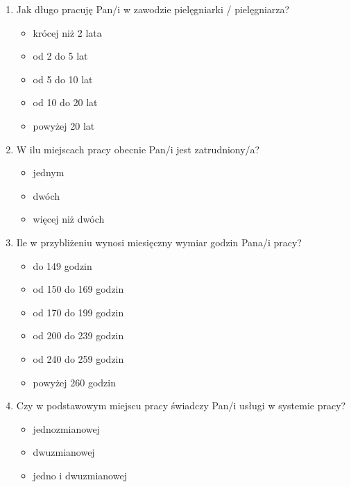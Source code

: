 \documentclass[a4paper,12pt,twoside,openright]{mwrep}
\begin{document}
\begin{appendices}
\begin{enumerate}[label=(\Roman*)]
\end{enumerate}

\begin{enumerate}[label=\arabic*)]
		\item{Jak długo pracuję  Pan/i w zawodzie pielęgniarki / pielęgniarza?}
		\begin{itemize}
			\item{krócej niż 2 lata}
			\item{od 2 do 5 lat}
			\item{od 5 do 10 lat}
			\item{od 10 do 20 lat}
			\item{powyżej 20 lat}
		\end{itemize}
		\vspace{\baselineskip} 
		
		\item{W ilu miejscach pracy obecnie Pan/i jest zatrudniony/a?}
		\begin{itemize}
			\item{jednym}
			\item{dwóch}
			\item{więcej niż dwóch}
		\end{itemize}
		\vspace{\baselineskip} 
		
		\item{Ile w przybliżeniu wynosi miesięczny wymiar godzin Pana/i pracy?}
		\begin{itemize}
			\item{do 149 godzin}
			\item{od 150 do 169 godzin}
			\item{od 170 do 199 godzin}
			\item{od 200 do 239 godzin}
			\item{od 240 do 259 godzin}
			\item{powyżej 260 godzin}
		\end{itemize}
		\vspace{\baselineskip} 
		
		\item{Czy w podstawowym miejscu pracy świadczy Pan/i usługi w systemie pracy?}
		\begin{itemize}
			\item{jednozmianowej}
			\item{dwuzmianowej}
			\item{jedno i dwuzmianowej}
		\end{itemize}
		\vspace{\baselineskip} 
		

\end{enumerate}
\end{appendices}
\end{document}
